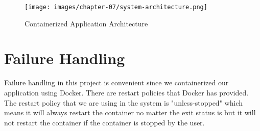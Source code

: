     \FloatBarrier
    	\begin{figure}[h!]
            \centering
        		\texttt{[image: images/chapter-07/system-architecture.png]}
        		\caption{Containerized Application Architecture}
        		\label{fig:system-architecture}
        \end{figure}
    \FloatBarrier
    
\section{Failure Handling}
    Failure handling in this project is convenient since we containerized our application using Docker. There are restart policies that Docker has provided. The restart policy that we are using in the system is "unless-stopped" which means it will always restart the container no matter the exit status is but it will not restart the container if the container is stopped by the user.